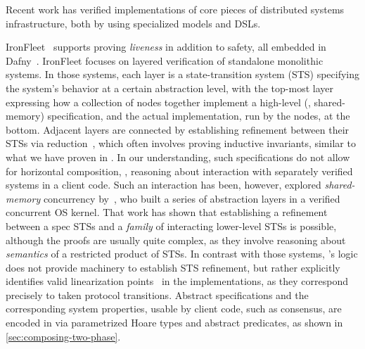 Recent work has verified implementations of core pieces of distributed
systems infrastructure, both by using specialized models and DSLs.


IronFleet~\cite{Hawblitzel-al:SOSP15} supports proving \emph{liveness}
in addition to safety, all embedded in Dafny~\cite{Leino:LPAR10}.
%
%
IronFleet focuses on layered verification of standalone monolithic
systems.
%
In those systems, each layer is a state-transition system (STS)
specifying the system's behavior at a certain abstraction level, with
the top-most layer expressing how a collection of nodes together
implement a high-level (\eg, shared-memory) specification,
%
and the actual implementation, run by the nodes, at the bottom.
%
Adjacent layers are connected by establishing refinement between
their %
STSs via reduction~\cite{Lipton-CACM75}, which often involves proving
inductive invariants, similar to what we have proven in \disel.
%
%
In our understanding, such specifications do not allow for horizontal
composition, \ie, reasoning about interaction with separately verified
systems in a client code.
%
Such an interaction has been, however, explored \wrt
\emph{shared-memory} concurrency by~\citet{Gu-al:OSDI16}, who built a
series of abstraction layers in a verified concurrent OS kernel. That
work has shown that establishing a refinement between a spec STSs and
a \emph{family} of interacting lower-level STSs is possible, although
the proofs are usually quite complex, as they involve reasoning about
\emph{semantics} of a restricted product of STSs.
%
In contrast with those systems, \disel's logic does not provide
machinery to establish STS refinement, but rather explicitly
identifies valid linearization points~\cite{herlihy:linearizability} in
the implementations, as they correspond precisely to taken protocol
transitions.
%
Abstract specifications and the corresponding system properties, usable
by client code, such as consensus, are encoded in \disel via
parametrized Hoare types and abstract predicates, as shown in
\cref{sec:composing-two-phase}.

